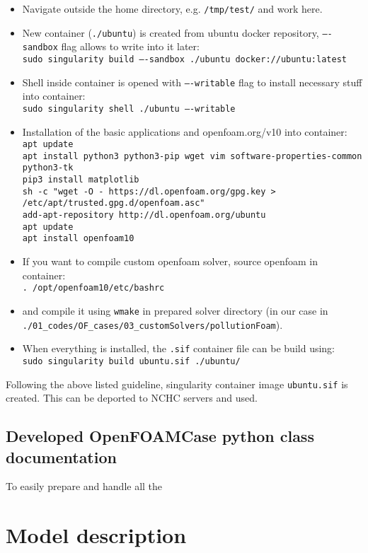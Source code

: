 \begin{itemize}
    \item Navigate outside the home directory, e.g. \texttt{/tmp/test/} and work here.
    \item New container (\texttt{./ubuntu}) is created from ubuntu docker repository, \texttt{----sandbox} flag allows to write into it later:\\[0.2cm] 
    \texttt{sudo singularity build ----sandbox ./ubuntu docker://ubuntu:latest}
    \item Shell inside container is opened with \texttt{----writable} flag to install necessary stuff into container:\\[0.2cm] 
    \texttt{sudo singularity shell ./ubuntu ----writable}
    \item Installation of the basic applications and openfoam.org/v10 into container:\\[0.2cm] 
    \texttt{apt update}\\
    \texttt{apt install python3 python3-pip wget vim software-properties-common \\ \indent\quad\quad python3-tk}\\
    \texttt{pip3 install matplotlib}\\
    \texttt{sh -c "wget -O - https://dl.openfoam.org/gpg.key >} \\ \indent\quad\quad\texttt{/etc/apt/trusted.gpg.d/openfoam.asc"}\\
    \texttt{add-apt-repository http://dl.openfoam.org/ubuntu}\\
    \texttt{apt update}\\
    \texttt{apt install openfoam10}
    \item If you want to compile custom openfoam solver, source openfoam in container:\\[0.2cm] 
    \texttt{. /opt/openfoam10/etc/bashrc}
    \item and compile it using \texttt{wmake} in prepared solver directory (in our case in\\ \texttt{./01\_codes/OF\_cases/03\_customSolvers/pollutionFoam}).
    \item When everything is installed, the \texttt{.sif} container file can be build using:\\[0.2cm] 
    \texttt{sudo singularity build ubuntu.sif ./ubuntu/}
\end{itemize}

Following the above listed guideline, singularity container image \texttt{ubuntu.sif} is created. This can be deported to NCHC servers and used. 

\subsection{Developed OpenFOAMCase python class documentation}
\label{subsec:ofCaseClass}
To easily prepare and handle all the 

\section{Model description}
\label{sec:modDesc}


